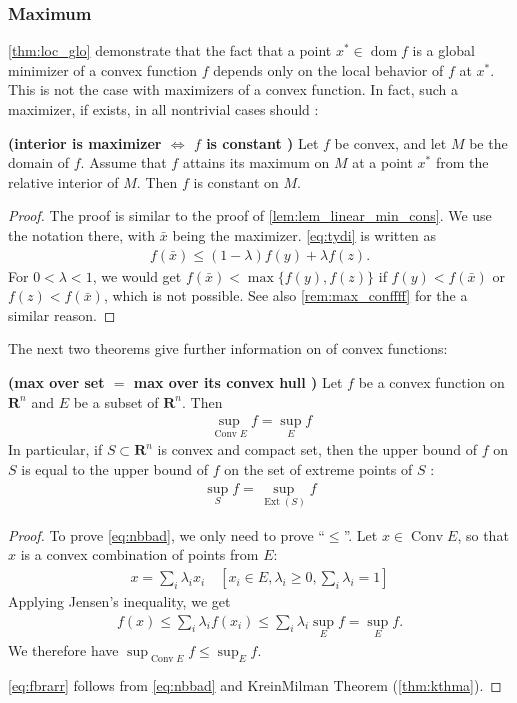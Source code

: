 \documentclass{article}
\newcommand{\bfs}[1]{\textbf{({#1}) }}
\newcommand{\dom}{\operatorname{dom}}
\begin{document}
\subsubsection{Maximum}
\cref{thm:loc_glo} demonstrate that the fact that a point $x^{*} \in\dom f$ is a global minimizer of a convex function $f$ depends only on the local behavior of $f$ at $x^{*}$. This is not the case with maximizers of a convex function. In fact, such a maximizer, if exists, in all nontrivial cases should :
\begin{thma}\bfs{interior is maximizer $\Leftrightarrow$ $f$ is constant }\label{thm:max_convf}
Let $f$ be convex, and let $M$ be the domain of $f$. Assume that $f$ attains its maximum on $M$ at a point $x^{*}$ from the relative interior of $M .$ Then $f$ is constant on $M$.
\end{thma} 
\begin{proof}\color{ForestGreen}
The proof is similar to the proof of \cref{lem:lem_linear_min_cons}. We use the notation there, with $\bar{x}$ being the maximizer. \cref{eq:tydi} is written as
\begin{align}
f(\bar{x})\le (1-\lambda) f(y)+\lambda f(z).
\end{align}
For $0<\lambda<1$, we would get $f(\bar{x})< \max\{f(y), f(z)\}$ if $f(y)< f(\bar{x})$ or $f(z)< f(\bar{x})$, which is not possible. See also \cref{rem:max_conffff} for the a similar reason.
\end{proof}
The next two theorems give further information on  of convex functions:
\begin{thma}\bfs{max over set $=$ max over its convex hull }
Let $f$ be a convex function on $\mathbf{R}^{n}$ and $E$ be a subset of $\mathbf{R}^{n} .$ Then
\begin{align}
\sup _{\operatorname{Conv} E} f=\sup _{E} f\label{eq:nbbad}
\end{align}
In particular, if $S \subset \mathbf{R}^{n}$ is convex and compact set, then the upper bound of $f$ on $S$ is equal to the upper bound of $f$ on the set of extreme points of $S$ :
\begin{align}
\sup _{S} f=\sup _{\operatorname{Ext}(S)} f\label{eq:fbrarr}
\end{align}
\end{thma} 
\begin{proof}\color{ForestGreen}
 To prove \cref{eq:nbbad}, we only need to prove ``$\le$''. Let $x \in \operatorname{Conv} E$, so that $x$ is a convex combination of points from $E$:
\begin{align*}
x=\sum_{i} \lambda_{i} x_{i} \quad\left[x_{i} \in E, \lambda_{i} \geq 0, \sum_{i} \lambda_{i}=1\right]
\end{align*}
Applying Jensen's inequality, we get
\begin{align*}
f(x) \leq \sum_{i} \lambda_{i} f\left(x_{i}\right) \leq \sum_{i} \lambda_{i} \sup _{E} f=\sup _{E} f.
\end{align*}
We therefore have $\sup _{\operatorname{Conv} E} f\le \sup _{E} f$.

\cref{eq:fbrarr} follows from \cref{eq:nbbad} and KreinMilman Theorem  (\cref{thm:kthma}).
\end{proof}
\end{document}
